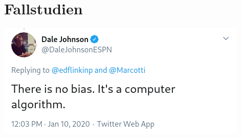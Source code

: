\documentclass[aspectratio=169,xcolor=dvipsnames]{beamer}
\begin{document}

\begin{frame}
\end{frame}



\section{Fallstudien}

\begin{frame}
\begin{center}
\includegraphics[height=0.65\paperheight,keepaspectratio]{images/no_bias} 
\end{center}
\end{frame}
\end{document}
